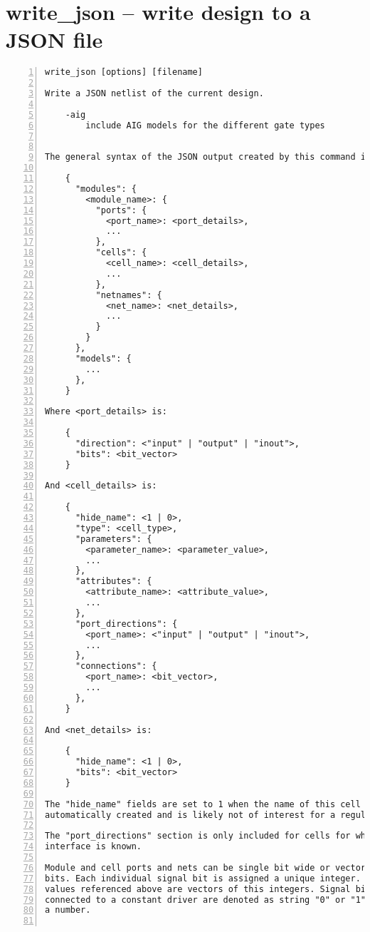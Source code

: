 \section{write\_json -- write design to a JSON file}
\label{cmd:write_json}
\begin{lstlisting}[numbers=left,frame=single]
    write_json [options] [filename]

Write a JSON netlist of the current design.

    -aig
        include AIG models for the different gate types


The general syntax of the JSON output created by this command is as follows:

    {
      "modules": {
        <module_name>: {
          "ports": {
            <port_name>: <port_details>,
            ...
          },
          "cells": {
            <cell_name>: <cell_details>,
            ...
          },
          "netnames": {
            <net_name>: <net_details>,
            ...
          }
        }
      },
      "models": {
        ...
      },
    }

Where <port_details> is:

    {
      "direction": <"input" | "output" | "inout">,
      "bits": <bit_vector>
    }

And <cell_details> is:

    {
      "hide_name": <1 | 0>,
      "type": <cell_type>,
      "parameters": {
        <parameter_name>: <parameter_value>,
        ...
      },
      "attributes": {
        <attribute_name>: <attribute_value>,
        ...
      },
      "port_directions": {
        <port_name>: <"input" | "output" | "inout">,
        ...
      },
      "connections": {
        <port_name>: <bit_vector>,
        ...
      },
    }

And <net_details> is:

    {
      "hide_name": <1 | 0>,
      "bits": <bit_vector>
    }

The "hide_name" fields are set to 1 when the name of this cell or net is
automatically created and is likely not of interest for a regular user.

The "port_directions" section is only included for cells for which the
interface is known.

Module and cell ports and nets can be single bit wide or vectors of multiple
bits. Each individual signal bit is assigned a unique integer. The <bit_vector>
values referenced above are vectors of this integers. Signal bits that are
connected to a constant driver are denoted as string "0" or "1" instead of
a number.


\end{lstlisting}
